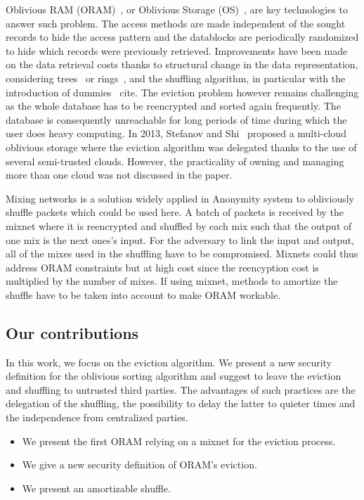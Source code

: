\documentclass[conference]{IEEEtran}
\begin{document}
Oblivious RAM (ORAM)~\cite{goldreich87}, or Oblivious Storage (OS)~\cite{boneh2011}, are key technologies to answer such problem. The access methods are made independent of the sought records to hide the access pattern and the datablocks are periodically randomized to hide which records were previously retrieved.
Improvements have been made on the data retrieval costs thanks to structural change in the data representation, considering trees~\cite{} or rings~\cite{}, and the shuffling algorithm, in particular with the introduction of dummies ~cite{}.
The eviction problem however remains challenging as the whole database has to be reencrypted and sorted again frequently. The database is consequently unreachable for long periods of time during which the user does heavy computing.
In 2013, Stefanov and Shi~\cite{stefanov2013} proposed a multi-cloud oblivious storage where the eviction algorithm was delegated thanks to the use of several semi-trusted clouds. However, the practicality of owning and managing more than one cloud was not discussed in the paper.

Mixing networks is a solution widely applied in Anonymity system to obliviously shuffle packets which could be used here. A batch of packets is received by the mixnet where it is reencrypted and shuffled by each mix such that the output of one mix is the next ones's input. For the adversary to link the input and output, all of the mixes used in the shuffling have to be compromised.
Mixnets could thus address ORAM constraints but at high cost since the reencyption cost is multiplied by the number of mixes. If using mixnet, methods to amortize the shuffle have to be taken into account to make ORAM workable.

\subsection{Our contributions}
In this work, we focus on the eviction algorithm. We present a new security definition for the oblivious sorting algorithm and suggest to leave the eviction and shuffling to untrusted third parties.
The advantages of such practices are the delegation of the shuffling, the possibility to delay the latter to quieter times and the independence from centralized parties.

\begin{itemize}
 \item We present the first ORAM relying on a mixnet for the eviction process.
 \item We give a new security definition of ORAM's eviction. %
 \item We present an amortizable shuffle.
\end{itemize}
\end{document}
